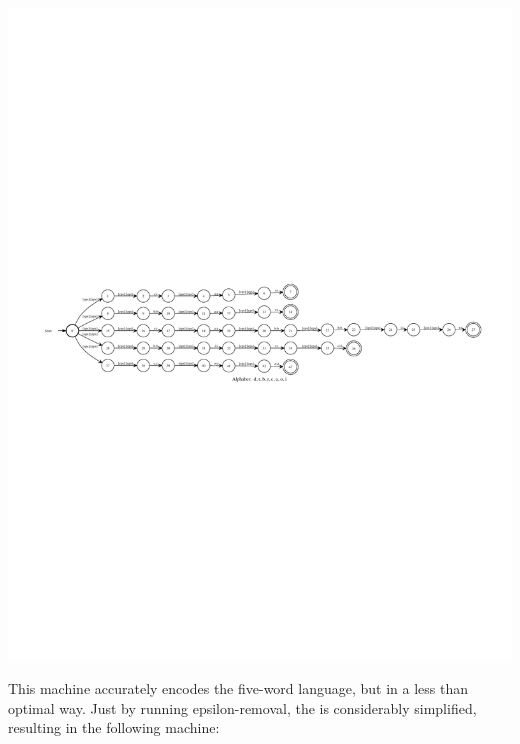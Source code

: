 \begin{center}
\includegraphics[width=135mm]{images/unoptimized.pdf}
\end{center}

\noindent
This machine accurately encodes the five-word language, but in a less than
optimal way.
Just by running epsilon-removal, the \fsm{} is considerably simplified,
resulting in the following machine:


